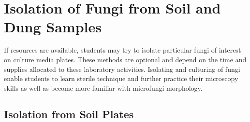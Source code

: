 \documentclass[]{book}
\begin{document}
\section{Isolation of Fungi from Soil and Dung
Samples}\label{isolation-of-fungi-from-soil-and-dung-samples}

If resources are available, students may try to isolate particular fungi
of interest on culture media plates. These methods are optional and
depend on the time and supplies allocated to these laboratory
activities. Isolating and culturing of fungi enable students to learn
sterile technique and further practice their microscopy skills as well
as become more familiar with microfungi morphology.

\subsection{Isolation from Soil
Plates}\label{isolation-from-soil-plates}
\end{document}
